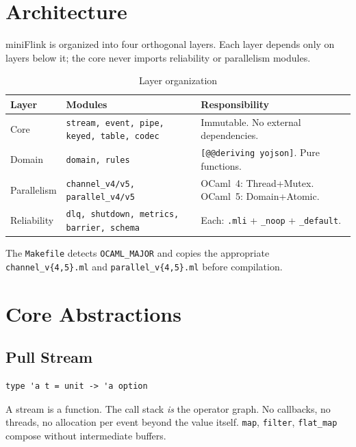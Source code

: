 \documentclass[11pt,a4paper]{article}
\begin{document}
\section{Architecture}

miniFlink is organized into four orthogonal layers. Each layer depends
only on layers below it; the core never imports reliability or
parallelism modules.

\begin{table}[h]
\centering
\caption{Layer organization}
\begin{tabular}{lll}
\toprule
Layer & Modules & Responsibility \\
\midrule
Core & \texttt{stream, event, pipe, keyed, table, codec} &
  Immutable. No external dependencies. \\
Domain & \texttt{domain, rules} &
  \texttt{[@@deriving yojson]}. Pure functions. \\
Parallelism & \texttt{channel\_v4/v5, parallel\_v4/v5} &
  OCaml~4: Thread+Mutex. OCaml~5: Domain+Atomic. \\
Reliability & \texttt{dlq, shutdown, metrics, barrier, schema} &
  Each: \texttt{.mli} + \texttt{\_noop} + \texttt{\_default}. \\
\bottomrule
\end{tabular}
\end{table}

The \texttt{Makefile} detects \texttt{OCAML\_MAJOR} and copies
the appropriate \texttt{channel\_v\{4,5\}.ml} and
\texttt{parallel\_v\{4,5\}.ml} before compilation.

\section{Core Abstractions}

\subsection{Pull Stream}

\begin{lstlisting}
type 'a t = unit -> 'a option
\end{lstlisting}

A stream is a function. The call stack \emph{is} the operator graph.
No callbacks, no threads, no allocation per event beyond the value
itself. \texttt{map}, \texttt{filter}, \texttt{flat\_map} compose
without intermediate buffers.
\end{document}
